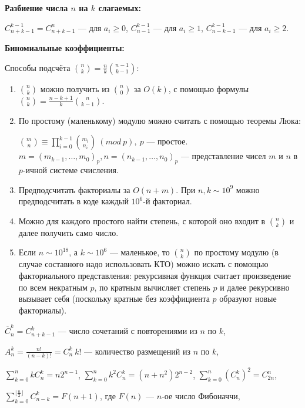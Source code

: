 \textbf{Разбиение числа $n$ на $k$ слагаемых:}

$C_{n + k - 1}^{k - 1}=C_{n + k - 1}^n$ --- для $a_i \ge 0$,
$C_{n - 1}^{k - 1}$ --- для $a_i \ge 1$,
$C_{n - k - 1}^{k - 1}$ --- для $a_i \ge 2$.

\textbf{Биномиальные коэффициенты:}

Способы подсчёта $\binom{n}{k}=\frac nk \binom{n-1}{k-1}$:

\begin{enumerate}

\item $\binom{n}{k}$ можно получить из $\binom{n}{0}$ за $O(k)$, с помощью формулы $\binom{n}{k}=\frac{n-k+1}k \binom{n}{k-1}$.

\item По простому (маленькому) модулю можно считать с помощью теоремы Люка:

$\displaystyle \binom{m}{n} \equiv \prod\limits_{i = 0}^{k - 1} \binom{m_i}{n_i}\ (mod\ p),\ p$ --- простое.
$\displaystyle m = (m_{k - 1}, \dots, m_0)_p, n = (n_{k - 1}, \dots, n_0)_p$ --- представление чисел $m$ и $n$ в $p$-ичной системе счисления.

\item Предподсчитать факториалы за $O(n+m)$. При $n, k \sim 10^9$ можно предподсчитать в коде каждый $10^6$-й факториал.

\item Можно для каждого простого найти степень, с которой оно входит в $\binom{n}{k}$ и далее получить само число.

\item Если $n\sim 10^{18}$, а $k\sim 10^6$ --- маленькое, то $\binom{n}{k}$ по простому модулю (в случае составного надо использовать КТО)
можно искать с помощью факториального представления: рекурсивная функция считает произведение по всем некратным $p$, по кратным вычисляет
степень $p$ и далее рекурсивно вызывает себя (поскольку кратные без коэффициента $p$ образуют новые факториалы).

\end{enumerate}

$\overline{C}_n^k=C_{n + k - 1}^k$ --- число сочетаний с повторениями из $n$ по $k$,

$A_n^k=\frac{n!}{(n-k)!}=C_n^k\:k!$ --- количество размещений из $n$ по $k$,

$\sum\limits_{k=0}^{n}k C_n^k=n2^{n-1}$, $\sum\limits_{k=0}^{n}k^2 C_n^k=(n+n^2)2^{n-2}$,
$\sum\limits_{k=0}^{n}{(C_n^{k})^2}=C_{2n}^n$,

$\sum\limits_{k=0}^{\lfloor\frac{n}{2}\rfloor}C_{n-k}^k=F(n+1)$, где $F(n)$ --- $n$-ое число Фибоначчи,


